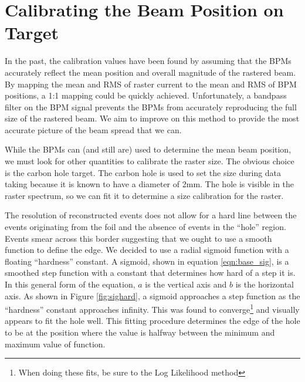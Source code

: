 \section{Calibrating the Beam Position on Target}

In the past, the calibration values have been found by assuming that the BPMs accurately reflect the mean position and overall magnitude of the rastered beam. By mapping the mean and RMS of raster current to the mean and RMS of BPM positions, a 1:1 mapping could be quickly achieved. Unfortunately, a bandpass filter on the BPM signal prevents the BPMs from accurately reproducing the full size of the rastered beam. We aim to improve on this method to provide the most accurate picture of the beam spread that we can.\cite{bpm_slow}


While the BPMs can (and still are) used to determine the mean beam position, we must look for other quantities to calibrate the raster size. The obvious choice is the carbon hole target. The carbon hole is used to set the size during data taking because it is known to have a diameter of 2mm. The hole is visible in the raster spectrum, so we can fit it to determine a size calibration for the raster.

The resolution of reconstructed events does not allow for a hard line between the events originating from the foil and the absence of events in the ``hole'' region. Events smear across this border suggesting that we ought to use a smooth function to define the edge. We decided to use a radial sigmoid function with a floating ``hardness'' constant. A sigmoid, shown in equation \ref{eqn:base_sig}, is a smoothed step function with a constant that determines how hard of a step it is. In this general form of the equation, $a$ is the vertical axis and $b$ is the horizontal axis. As shown in Figure \ref{fig:sighard}, a sigmoid approaches a step function as the ``hardness'' constant approaches infinity. This was found to converge\footnote{When doing these fits, be sure to the Log Likelihood method} and visually appears to fit the hole well. This fitting procedure determines the edge of the hole to be at the position where the value is halfway between the minimum and maximum value of function.\cite{Evan}

